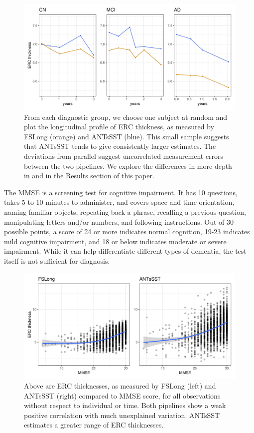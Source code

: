 \documentclass[12pt]{article}
\begin{document}
\begin{figure}[H]
\centering
\includegraphics[width=\linewidth]{figures/profiles_by_pipeline}
\caption{From each diagnostic group, we choose one subject at random and plot the longitudinal profile of ERC thickness, as measured by FSLong (orange) and ANTsSST (blue). This small sample suggests that ANTsSST tends to give consistently larger estimates. The deviations from parallel suggest uncorrelated measurement errors between the two pipelines. We explore the differences in more depth in \citep{birchfield2022synthesizing} and in the Results section of this paper.} 
\end{figure}

The MMSE is a screening test for cognitive impairment. It has 10 questions, takes 5 to 10 minutes to administer, and covers space and time orientation, naming familiar objects, repeating back a phrase, recalling a previous question, manipulating letters and/or numbers, and following instructions. Out of 30 possible points, a score of 24 or more indicates normal cognition, 19-23 indicates mild cognitive impairment, and 18 or below indicates moderate or severe impairment. While it can help differentiate different types of dementia, the test itself is not sufficient for diagnosis.

\begin{figure}[H]
\centering
\includegraphics[width=\linewidth]{figures/erc_mmse_scatterplot}
\caption{Above are ERC thicknesses, as measured by FSLong (left) and ANTsSST (right) compared to MMSE score, for all observations without respect to individual or time. Both pipelines show a weak positive correlation with much unexplained variation. ANTsSST estimates a greater range of ERC thicknesses.} 
\end{figure}
\end{document}
